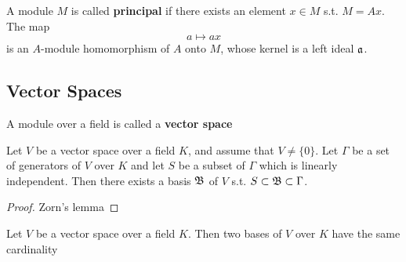 \documentclass[11pt]{article}
\begin{document}
A module \(M\) is called \textbf{principal} if there exists an element \(x\in M\) s.t. \(M=Ax\). The map
 \begin{equation*}
a\mapsto ax
 \end{equation*}
is an \(A\)-module homomorphism of \(A\) onto \(M\), whose kernel is a left ideal \(\mathfrak{a}\).

\subsection{Vector Spaces}
\label{sec:orgf52a1ee}
A module over a field is called a \textbf{vector space}

\begin{theorem}[]
Let \(V\) be a vector space over a field \(K\), and assume that \(V\neq\{0\}\). Let \(\Gamma\) be a set of
generators of \(V\) over \(K\) and let \(S\) be a subset of \(\Gamma\) which is linearly independent. Then
there exists a basis \(\mathfrak{B}\) of \(V\) s.t. \(S\subset\mathfrak{B}\subset\Gamma\).
\end{theorem}

\begin{proof}
Zorn's lemma
\end{proof}

\begin{theorem}[]
Let \(V\) be a vector space over a field \(K\). Then two bases of \(V\) over \(K\) have the same cardinality
\end{theorem}
\end{document}
